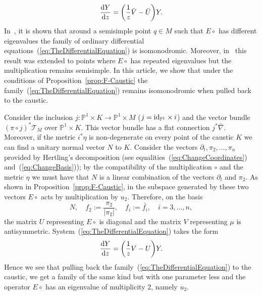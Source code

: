 \documentclass[pdftex]{sigma}
\numberwithin{equation}{section}
\begin{document}
 \begin{equation*}
 \frac{{\rm d}Y}{{\rm d}z}=\biggl( \frac{1}{z}\bar{V}-\bar{U}\biggr)Y.
 \end{equation*}
 In~\cite{Dubrovin:1994hc}, it is shown that around a semisimple point $q\in M$ such that $E\circ$ has different eigenvalues the family of ordinary differential equations~(\ref{eq:TheDifferentialEquation}) is isomonodromic. Moreover, in~\cite{MR4094756} this result was extended to points where $E\circ$ has repeated eigenvalues but the multiplication remains semisimple. In this article, we show that under the conditions of Proposition~\ref{prop:F-Caustic} the family~(\ref{eq:TheDifferentialEquation}) remains isomonodromic when pulled back to the caustic.

 Consider the inclusion $j\colon\mathbb{P}^{1}\times K\rightarrow\mathbb{P}^{1}\times M$ ($j={\rm id}_{\mathbb{P}^{1}}\times i$) and the vector bundle $(\pi\circ j)^{*}\mathcal{T}_{M}$ over $\mathbb{P}^{1}\times K$. This vector bundle has a flat connection $j^{*}\bar{\nabla}$. Moreover, if the metric $i^{*}\eta$ is non-degenerate on every point of the caustic $K$ we can find a unitary normal vector $N$ to $K$. Consider the vectors $\partial_{t},\pi_{2},\dots,\pi_{n}$ provided by Hertling's decomposition (see equalities~(\ref{eq:ChangeCoordinates}) and~(\ref{eq:ChangeBasis})); by the compatibility of the multiplication $\circ$ and the metric $\eta$ we must have that $N$ is a linear combination of the vectors $\partial_{t}$ and $\pi_{2}$. As shown in Proposition~\ref{prop:F-Caustic}, in the subspace generated by these two vectors $E\circ$ acts by multiplication by $u_{2}$. Therefore, on the basis
 \begin{equation*}
 N, \quad f_{2}:=\frac{\pi_{2}}{|\pi_{2}|},\quad f_{i}:=\bar{f_{i}}, \quad i=3,\dots,n,
 \end{equation*}
 the matrix $U$ representing $E\circ$ is diagonal and the matrix $V$ representing $\mu$ is antisymmetric. System~(\ref{eq:TheDifferentialEquation}) takes the form
 \begin{equation*}
 \frac{{\rm d}Y}{{\rm d}z}=\biggl( \frac{1}{z}V-U\biggr)Y.
 \end{equation*}
 Hence we see that pulling back the family~(\ref{eq:TheDifferentialEquation}) to the caustic, we get a family of the same kind but with one parameter less and the operator $E\circ$ has an eigenvalue of multiplicity $2$, namely $u_{2}$.
\end{document}
